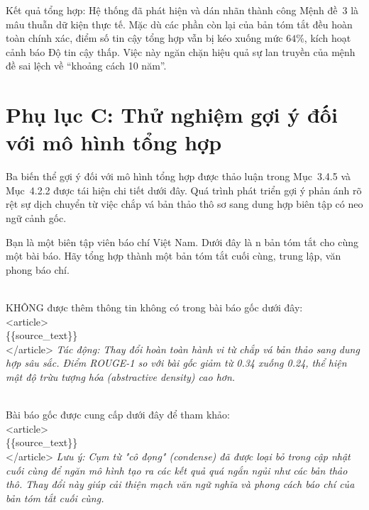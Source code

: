 Kết quả tổng hợp: Hệ thống đã phát hiện và dán nhãn thành công Mệnh đề~3 là mâu thuẫn dữ kiện thực tế. Mặc dù các phần còn lại của bản tóm tắt đều hoàn toàn chính xác, điểm số tin cậy tổng hợp vẫn bị kéo xuống mức $64\%$, kích hoạt cảnh báo Độ tin cậy thấp. Việc này ngăn chặn hiệu quả sự lan truyền của mệnh đề sai lệch về ``khoảng cách 10 năm''.

\section*{Phụ lục C: Thử nghiệm gợi ý đối với mô hình tổng hợp}

Ba biến thể gợi ý đối với mô hình tổng hợp được thảo luận trong Mục~3.4.5 và Mục~4.2.2 được tái hiện chi tiết dưới đây. Quá trình phát triển gợi ý phản ánh rõ rệt sự dịch chuyển từ việc chắp vá bản thảo thô sơ sang dung hợp biên tập có neo ngữ cảnh gốc.

\begin{tcolorbox}[title=Biến thể cơ sở (Chỉ chắp vá bản thảo), colback=gray!5!white, colframe=gray!75!black, breakable, fontupper=\small\ttfamily]
Bạn là một biên tập viên báo chí Việt Nam. Dưới đây là n bản tóm tắt cho cùng một bài báo. Hãy tổng hợp thành một bản tóm tắt cuối cùng, trung lập, văn phong báo chí.
\end{tcolorbox}

\begin{tcolorbox}\\
KHÔNG được thêm thông tin không có trong bài báo gốc dưới đây:\\
<article>\\
\{\{source\_text\}\}\\
</article>
\tcblower
\textit{Tác động: Thay đổi hoàn toàn hành vi từ chắp vá bản thảo sang dung hợp sâu sắc. Điểm ROUGE-1 so với bài gốc giảm từ 0.34 xuống 0.24, thể hiện mật độ trừu tượng hóa (abstractive density) cao hơn.}
\end{tcolorbox}

\begin{tcolorbox}\\
Bài báo gốc được cung cấp dưới đây để tham khảo:\\
<article>\\
\{\{source\_text\}\}\\
</article>
\tcblower
\textit{Lưu ý: Cụm từ "cô đọng" (condense) đã được loại bỏ trong cập nhật cuối cùng để ngăn mô hình tạo ra các kết quả quá ngắn ngủi như các bản thảo thô. Thay đổi này giúp cải thiện mạch văn ngữ nghĩa và phong cách báo chí của bản tóm tắt cuối cùng.}
\end{tcolorbox}

